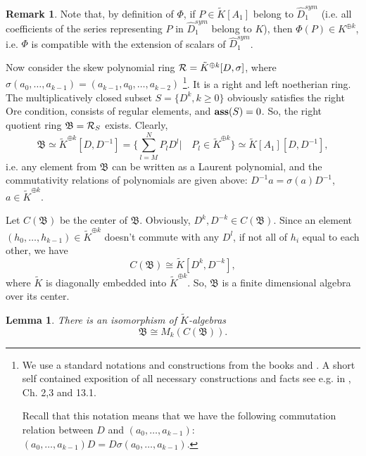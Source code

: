\documentclass[11pt]{article}
\theoremstyle{definition}
\newtheorem{rem}{Remark}[section]
\theoremstyle{plain}
\newtheorem{lemma}{Lemma}[section]
\numberwithin{equation}{section}
\newcommand{\crr}{{{\cal R}}}
\begin{document}
\begin{rem}
\label{R:Phi_over_K}
Note that, by definition of $\Phi$, if $P\in \tilde{K}[A_1]$ belong to $\hat{D}_1^{sym}$ (i.e. all coefficients of the series representing $P$ in  $\hat{D}_1^{sym}$ belong to $K$), then $\Phi (P)\in K^{\oplus k}$, i.e. $\Phi$ is compatible with the extension of scalars of $\hat{D}_1^{sym}$.
\end{rem}

Now consider the skew polynomial ring $\crr = \tilde{K}^{\oplus k} [D,\sigma ]$, where \\
$\sigma (a_0,\ldots ,a_{k-1})= (a_{k-1}, a_0, \ldots , a_{k-2})$ \footnote{We use a standard notations and constructions from the books \cite{Cohn} and \cite{NNR}. A short self contained exposition of all necessary constructions and facts see e.g. in \cite{Zheglov_book}, Ch. 2,3 and 13.1. 

Recall that this notation means that we have the following commutation relation between $D$ and $(a_0, \ldots ,a_{k-1})$: $(a_0, \ldots ,a_{k-1})D=D\sigma (a_0, \ldots ,a_{k-1})$. }. It is a right and left noetherian ring. The multiplicatively closed subset $S=\{ D^k, k\ge 0\}$ obviously satisfies the right Ore condition, consists of regular elements, and ${\bf ass} (S)=0$. So, the right quotient ring $\mathfrak{B}=\crr_S$ exists. Clearly, 
$$
\mathfrak{B}\simeq\tilde{K}^{\oplus k}[D,D^{-1}]=\{\sum_{l=M}^NP_lD^l | \quad P_l\in \tilde{K}^{\oplus k}\}\simeq \tilde{K}[A_1][D,D^{-1}],
$$
i.e. any element from $\mathfrak{B}$ can be written as a Laurent polynomial, and the commutativity relations of polynomials are given above: $D^{-1}a=\sigma (a) D^{-1}$, $a\in \tilde{K}^{\oplus k}$.

Let $C(\mathfrak{B})$ be the center of $\mathfrak{B}$. Obviously, $D^k,D^{-k}\in C(\mathfrak{B})$. Since an element $(h_0,\ldots,h_{k-1})\in \tilde{K}^{\oplus k}$ doesn't commute with any $D^l$, if not all of $h_i$ equal to each other,  we have 
$$
C(\mathfrak{B})\cong \tilde{K}[D^k,D^{-k}],
$$
where $\tilde{K}$ is diagonally embedded into $\tilde{K}^{\oplus k}$. So, $\mathfrak{B}$ is a finite dimensional algebra over its center.


\begin{lemma}
\label{L:B is matrix algebra over C(B)}
	There is an isomorphism of $\tilde{K}$-algebras
	$$
	\mathfrak{B}\cong M_k(C(\mathfrak{B})).
	$$
\end{lemma} 
\end{document}
